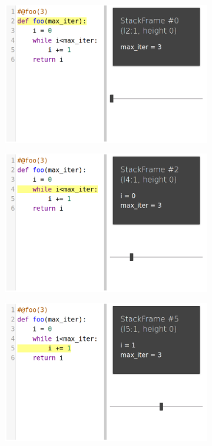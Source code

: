 \documentclass[english,submission]{programming}
\begin{document}
\begin{figure}[htbp]
  \centering
  \begin{subfigure}[b]{0.4\textwidth}
      \centering
      \includegraphics[width=\textwidth]{img/demo/stack/0.png}
  \end{subfigure}
  \hfill
  \begin{subfigure}[b]{0.4\textwidth}
    \centering
    \includegraphics[width=\textwidth]{img/demo/stack/1.png}
  \end{subfigure}
  \vfill
  \begin{subfigure}[b]{0.4\textwidth}
    \centering
    \includegraphics[width=\textwidth]{img/demo/stack/2.png}

\end{subfigure}
\end{figure}
\end{document}
